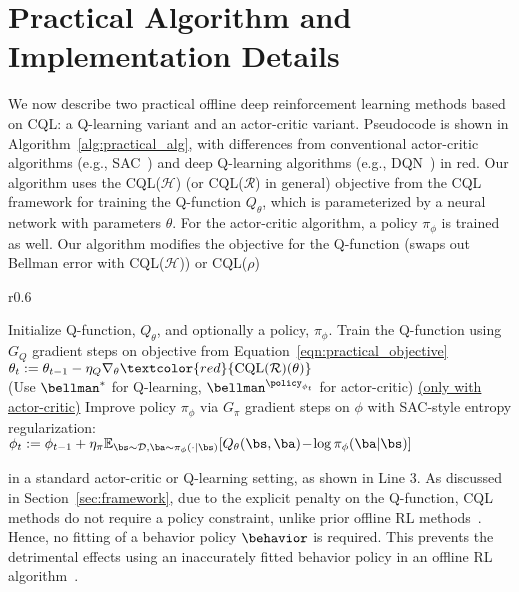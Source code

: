 \section{Practical Algorithm and Implementation Details}
\label{sec:practical_alg}
\vspace{-5pt}
We now describe two practical offline deep reinforcement learning methods based on CQL: a Q-learning variant and an actor-critic variant. Pseudocode is shown in Algorithm~\ref{alg:practical_alg}, with differences from conventional actor-critic algorithms (e.g., SAC~\citep{haarnoja}) and deep Q-learning algorithms (e.g., DQN~\citep{mnih2013playing}) in red.
Our algorithm uses the CQL($\mathcal{H}$) (or CQL($\mathcal{R}$) in general) objective from the CQL framework for training the Q-function $Q_\theta$, which is parameterized by a neural network with parameters $\theta$. For the actor-critic algorithm, a policy $\pi_\phi$ is trained as well. Our algorithm modifies the objective for the Q-function (swaps out Bellman error with CQL($\mathcal{H}$)) or CQL($\rho$)
\begin{wrapfigure}{r}{0.6\textwidth}
\begin{small}
\vspace{-23pt}
\begin{minipage}[t]{0.99\linewidth}
\begin{algorithm}[H]
\small
\caption{Conservative Q-Learning (both variants)}
\label{alg:practical_alg}
\begin{algorithmic}[1]
    \STATE Initialize Q-function, $Q_\theta$, and optionally a policy, $\pi_\phi$.
        \STATE Train the Q-function using $G_Q$ gradient steps on objective from Equation~\ref{eqn:practical_objective} \\
        \mbox{$\theta_t := \theta_{t-1} - \eta_Q \nabla_\theta \textcolor{red}{\text{CQL}(\mathcal{R})(\theta)}$}\\
        (Use $\bellman^*$ for Q-learning, $\bellman^{\policy_{\phi_t}}$ for actor-critic)
        \STATE \underline{(only with actor-critic)} Improve policy $\pi_\phi$ via $G_\pi$ gradient steps on $\phi$ with SAC-style entropy regularization:\\
        \mbox{$\phi_{t} := \phi_{t-1} + \eta_\pi \mathbb{E}_{\bs \sim \mathcal{D}, \ba \sim \pi_\phi(\cdot|\bs)}[Q_\theta(\bs, \ba)\! -\! \log \pi_\phi(\ba|\bs)] $}
    \ENDFOR
\end{algorithmic}
\end{algorithm}
\end{minipage}
\vspace{-15pt}
\end{small}
\end{wrapfigure}
in a standard actor-critic or Q-learning setting, as shown in Line 3. As discussed in Section~\ref{sec:framework}, due to the explicit penalty on the Q-function, CQL methods do not require a policy constraint,
unlike prior offline RL methods~\citep{kumar2019stabilizing,wu2019behavior,siegel2020keep,levine2020offline}.
Hence, no fitting of a behavior policy $\behavior$ is required. This prevents the detrimental effects using an inaccurately fitted behavior policy in an offline RL algorithm~\citep{levine2020offline}.

